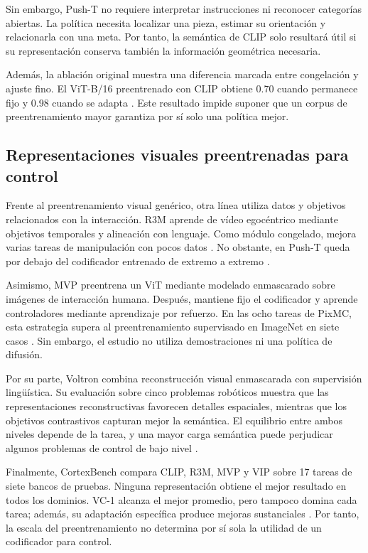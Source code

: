 Sin embargo, Push-T no requiere interpretar instrucciones ni reconocer categor\'ias
abiertas. La pol\'itica necesita localizar una pieza, estimar su orientaci\'on y
relacionarla con una meta. Por tanto, la sem\'antica de CLIP solo resultar\'a \'util si
su representaci\'on conserva tambi\'en la informaci\'on geom\'etrica necesaria.

Adem\'as, la ablaci\'on original muestra una diferencia marcada entre congelaci\'on y
ajuste fino. El ViT-B/16 preentrenado con CLIP obtiene \num{0.70} cuando permanece
fijo y \num{0.98} cuando se adapta \cite{chi2025diffusion}. Este resultado impide
suponer que un corpus de preentrenamiento mayor garantiza por s\'i solo una pol\'itica
mejor.

\subsection{Representaciones visuales preentrenadas para control}
\label{subsec:representaciones-control}

Frente al preentrenamiento visual gen\'erico, otra l\'inea utiliza datos y objetivos
relacionados con la interacci\'on. R3M aprende de v\'ideo egoc\'entrico mediante
objetivos temporales y alineaci\'on con lenguaje. Como m\'odulo congelado, mejora
varias tareas de manipulaci\'on con pocos datos \cite{nair2022r3m}. No obstante, en
Push-T queda por debajo del codificador entrenado de extremo a extremo
\cite{chi2025diffusion}.

Asimismo, MVP preentrena un ViT mediante modelado enmascarado sobre im\'agenes de
interacci\'on humana. Despu\'es, mantiene fijo el codificador y aprende controladores
mediante aprendizaje por refuerzo. En las ocho tareas de PixMC, esta estrategia
supera al preentrenamiento supervisado en ImageNet en siete casos
\cite{xiao2022mvp}. Sin embargo, el estudio no utiliza demostraciones ni una
pol\'itica de difusi\'on.

Por su parte, Voltron combina reconstrucci\'on visual enmascarada con supervisi\'on
ling\"u\'istica. Su evaluaci\'on sobre cinco problemas rob\'oticos muestra que las
representaciones reconstructivas favorecen detalles espaciales, mientras que los
objetivos contrastivos capturan mejor la sem\'antica. El equilibrio entre ambos
niveles depende de la tarea, y una mayor carga sem\'antica puede perjudicar algunos
problemas de control de bajo nivel \cite{karamcheti2023voltron}.

Finalmente, CortexBench compara CLIP, R3M, MVP y VIP sobre 17 tareas de siete bancos
de pruebas. Ninguna representaci\'on obtiene el mejor resultado en todos los dominios.
VC-1 alcanza el mejor promedio, pero tampoco domina cada tarea; adem\'as, su adaptaci\'on
espec\'ifica produce mejoras sustanciales \cite{majumdar2023vc1}. Por tanto, la escala
del preentrenamiento no determina por s\'i sola la utilidad de un codificador para
control.

